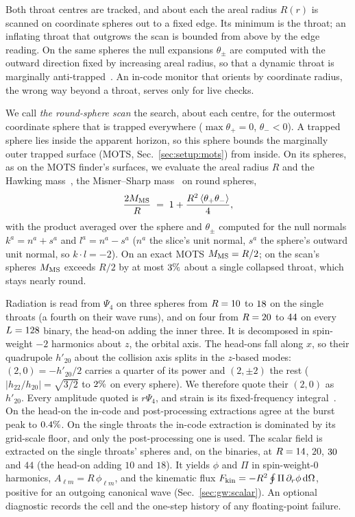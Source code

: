 \documentclass[twocolumn,floatfix,aps,prd,superscriptaddress,nofootinbib]{revtex4-2}
\begin{document}
Both throat centres are tracked, and about each the areal radius $R(r)$ is scanned on coordinate spheres out to a fixed edge. Its minimum is the throat; an inflating throat that outgrows the scan is bounded from above by the edge reading. On the same spheres the null expansions $\theta_\pm$ are computed with the outward direction fixed by increasing areal radius, so that a dynamic throat is marginally anti-trapped~\cite{hochberg_visser1998,hayward1999}. An in-code monitor that orients by coordinate radius, the wrong way beyond a throat, serves only for live checks.

We call \emph{the round-sphere scan} the search, about each centre, for the outermost coordinate sphere that is trapped everywhere ($\max\theta_+=0$, $\theta_-<0$). A trapped sphere lies inside the apparent horizon, so this sphere bounds the marginally outer trapped surface (MOTS, Sec.~\ref{sec:setup:mots}) from inside. On its spheres, as on the MOTS finder's surfaces, we evaluate the areal radius $R$ and the Hawking mass~\cite{hawking1968}, the Misner--Sharp mass~\cite{misner_sharp1964} on round spheres,
\begin{equation}
\frac{2M_{\rm MS}}{R} \;=\; 1 + \frac{R^{2}\,\langle\theta_+\theta_-\rangle}{4},
\label{eq:misner_sharp}
\end{equation}
with the product averaged over the sphere and $\theta_\pm$ computed for the null normals $k^a=n^a+s^a$ and $l^a=n^a-s^a$ ($n^a$ the slice's unit normal, $s^a$ the sphere's outward unit normal, so $k\cdot l=-2$). On an exact MOTS $M_{\rm MS}=R/2$; on the scan's spheres $M_{\rm MS}$ exceeds $R/2$ by at most $3\%$ about a single collapsed throat, which stays nearly round.

Radiation is read from $\Psi_4$ on three spheres from $R=10$ to $18$ on the single throats (a fourth on their wave runs), and on four from $R=20$ to $44$ on every $L=128$ binary, the head-on adding the inner three. It is decomposed in spin-weight $-2$ harmonics about $z$, the orbital axis. The head-ons fall along $x$, so their quadrupole $h'_{20}$ about the collision axis splits in the $z$-based modes: $(2,0)=-h'_{20}/2$ carries a quarter of its power and $(2,\pm2)$ the rest ($|h_{22}/h_{20}|=\sqrt{3/2}$ to $2\%$ on every sphere). We therefore quote their $(2,0)$ as $h'_{20}$. Every amplitude quoted is $r\Psi_4$, and strain is its fixed-frequency integral~\cite{reisswig2011}. On the head-on the in-code and post-processing extractions agree at the burst peak to $0.4\%$. On the single throats the in-code extraction is dominated by its grid-scale floor, and only the post-processing one is used. The scalar field is extracted on the single throats' spheres and, on the binaries, at $R=14$, $20$, $30$ and $44$ (the head-on adding $10$ and $18$). It yields $\phi$ and $\Pi$ in spin-weight-$0$ harmonics, $A_{\ell m}=R\,\phi_{\ell m}$, and the kinematic flux $F_{\rm kin}=-R^2\oint\Pi\,\partial_r\phi\,\mathrm{d}\Omega$, positive for an outgoing canonical wave (Sec.~\ref{sec:gw:scalar}). An optional diagnostic records the cell and the one-step history of any floating-point failure.
\end{document}
